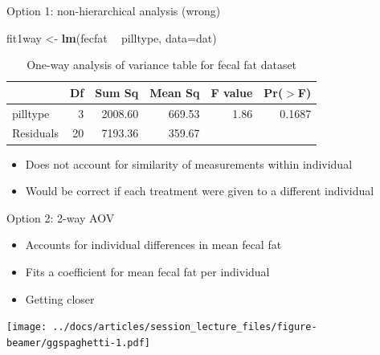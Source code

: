\documentclass[
  ignorenonframetext,
]{beamer}
\newenvironment{Shaded}{\begin{snugshade}}{\end{snugshade}}
\newcommand{\DataTypeTok}[1]{\textcolor[rgb]{0.13,0.29,0.53}{#1}}
\newcommand{\KeywordTok}[1]{\textcolor[rgb]{0.13,0.29,0.53}{\textbf{#1}}}
\newcommand{\NormalTok}[1]{#1}
\newcommand{\OperatorTok}[1]{\textcolor[rgb]{0.81,0.36,0.00}{\textbf{#1}}}
\newcommand{\StringTok}[1]{\textcolor[rgb]{0.31,0.60,0.02}{#1}}
\providecommand{\tightlist}{%
  \setlength{\itemsep}{0pt}\setlength{\parskip}{0pt}}
\begin{document}
\begin{frame}[fragile]{Option 1: non-hierarchical analysis (wrong)}
\protect\hypertarget{option-1-non-hierarchical-analysis-wrong-1}{}

\footnotesize

\begin{Shaded}
\begin{Highlighting}[]
\NormalTok{fit1way <-}\StringTok{ }\KeywordTok{lm}\NormalTok{(fecfat }\OperatorTok{~}\StringTok{ }\NormalTok{pilltype, }\DataTypeTok{data=}\NormalTok{dat)}
\end{Highlighting}
\end{Shaded}

\begin{table}[ht]
\centering
\begin{tabular}{lrrrrr}
  \hline
 & Df & Sum Sq & Mean Sq & F value & Pr($>$F) \\ 
  \hline
pilltype & 3 & 2008.60 & 669.53 & 1.86 & 0.1687 \\ 
  Residuals & 20 & 7193.36 & 359.67 &  &  \\ 
   \hline
\end{tabular}
\caption{One-way analysis of variance table for fecal fat dataset} 
\end{table}

\begin{itemize}
\tightlist
\item
  Does not account for similarity of measurements within individual
\item
  Would be correct if each treatment were given to a different
  individual
\end{itemize}

\end{frame}

\begin{frame}{Option 2: 2-way AOV}
\protect\hypertarget{option-2-2-way-aov}{}

\begin{itemize}
\tightlist
\item
  Accounts for individual differences in mean fecal fat
\item
  Fits a coefficient for mean fecal fat per individual
\item
  Getting closer
\end{itemize}

\texttt{[image: ../docs/articles/session\_lecture\_files/figure-beamer/ggspaghetti-1.pdf]}

\end{frame}
\end{document}

